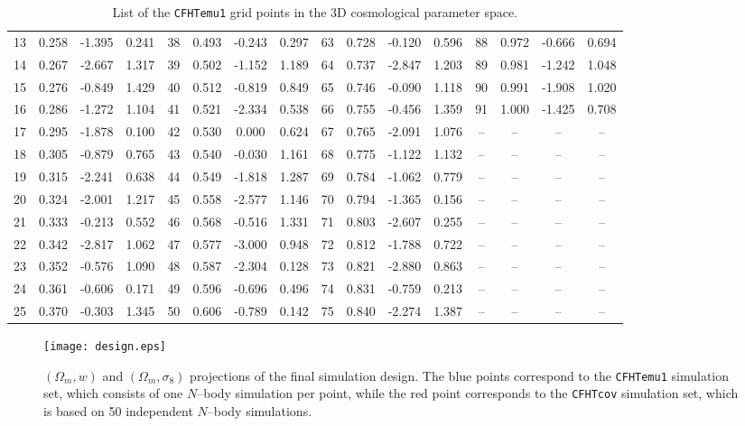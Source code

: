 \documentclass[reprint,aps,prd,superscriptaddress,showkeys,showpacs]{revtex4-1}
\begin{document}
\begin{table*}
\begin{tabular}{c|ccc||c|ccc||c|ccc||c|ccc}
13 & 0.258 & -1.395 & 0.241 & 38 & 0.493 & -0.243 & 0.297 & 63 & 0.728 & -0.120 & 0.596 & 88 & 0.972 & -0.666 & 0.694 \\
14 & 0.267 & -2.667 & 1.317 & 39 & 0.502 & -1.152 & 1.189 & 64 & 0.737 & -2.847 & 1.203 & 89 & 0.981 & -1.242 & 1.048 \\
15 & 0.276 & -0.849 & 1.429 & 40 & 0.512 & -0.819 & 0.849 & 65 & 0.746 & -0.090 & 1.118 & 90 & 0.991 & -1.908 & 1.020 \\
16 & 0.286 & -1.272 & 1.104 & 41 & 0.521 & -2.334 & 0.538 & 66 & 0.755 & -0.456 & 1.359 & 91 & 1.000 & -1.425 & 0.708 \\
17 & 0.295 & -1.878 & 0.100 & 42 & 0.530 & 0.000 & 0.624 & 67 & 0.765 & -2.091 & 1.076 & -- & -- & -- & -- \\
18 & 0.305 & -0.879 & 0.765 & 43 & 0.540 & -0.030 & 1.161 & 68 & 0.775 & -1.122 & 1.132 & -- & -- & -- & -- \\
19 & 0.315 & -2.241 & 0.638 & 44 & 0.549 & -1.818 & 1.287 & 69 & 0.784 & -1.062 & 0.779 & -- & -- & -- & -- \\
20 & 0.324 & -2.001 & 1.217 & 45 & 0.558 & -2.577 & 1.146 & 70 & 0.794 & -1.365 & 0.156 & -- & -- & -- & -- \\
21 & 0.333 & -0.213 & 0.552 & 46 & 0.568 & -0.516 & 1.331 & 71 & 0.803 & -2.607 & 0.255 & -- & -- & -- & -- \\
22 & 0.342 & -2.817 & 1.062 & 47 & 0.577 & -3.000 & 0.948 & 72 & 0.812 & -1.788 & 0.722 & -- & -- & -- & -- \\
23 & 0.352 & -0.576 & 1.090 & 48 & 0.587 & -2.304 & 0.128 & 73 & 0.821 & -2.880 & 0.863 & -- & -- & -- & -- \\
24 & 0.361 & -0.606 & 0.171 & 49 & 0.596 & -0.696 & 0.496 & 74 & 0.831 & -0.759 & 0.213 & -- & -- & -- & -- \\
25 & 0.370 & -0.303 & 1.345 & 50 & 0.606 & -0.789 & 0.142 & 75 & 0.840 & -2.274 & 1.387 & -- & -- & -- & -- \\
\end{tabular}
\caption{List of the \texttt{CFHTemu1} grid points in the 3D cosmological parameter space.}
\label{designtable}
\end{table*}
\begin{figure*}
\begin{center}
\texttt{[image: design.eps]}
\caption{$(\Omega_m,w)$ and $(\Omega_m,\sigma_8)$ projections of the final simulation design. The blue points correspond to the \texttt{CFHTemu1} simulation set, which consists of one $N$--body simulation per point, while the red point corresponds to the \texttt{CFHTcov} simulation set, which is based on 50 independent $N$--body simulations.}
\label{designfig}
\end{center}
\end{figure*}
\end{document}
